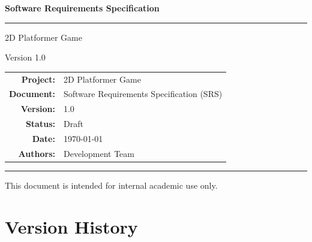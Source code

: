 \documentclass[12pt, letterpaper]{article}
\begin{document}
\begin{titlepage}
    \centering
    \vspace*{2cm}

    {\Huge\bfseries Software Requirements Specification\par}
    \vspace{0.5cm}
    \rule{\linewidth}{0.5pt}
    \vspace{0.5cm}

    {\LARGE 2D Platformer Game\par}
    \vspace{0.3cm}
    {\large Version 1.0\par}

    \vspace{2cm}

    \begin{tabular}{rl}
        \textbf{Project:}   & 2D Platformer Game \\[4pt]
        \textbf{Document:}  & Software Requirements Specification (SRS) \\[4pt]
        \textbf{Version:}   & 1.0 \\[4pt]
        \textbf{Status:}    & Draft \\[4pt]
        \textbf{Date:}      & \today \\[4pt]
        \textbf{Authors:}   & Development Team \\[4pt]
    \end{tabular}

    \vfill

    \rule{\linewidth}{0.5pt}
    {\small This document is intended for internal academic use only.}
\end{titlepage}

\newpage
\tableofcontents
\newpage

\section*{Version History}
\end{document}
